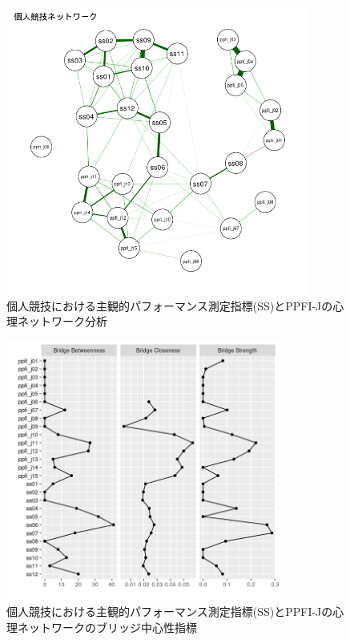 \documentclass[12pt,a4paper,xelatex,ja=standard]{bxjsarticle}
\begin{document}
\begin{figure}[H]
\centering
\includegraphics[clip,width = 10cm]{figure/individual network.png}
\caption{個人競技における主観的パフォーマンス測定指標(SS)とPPFI-Jの心理ネットワーク分析}
\end{figure}

\begin{figure}[H]
\centering
\includegraphics[clip,width = 9cm]{figure/individual_bridge.png}
\caption{個人競技における主観的パフォーマンス測定指標(SS)とPPFI-Jの心理ネットワークのブリッジ中心性指標}
\end{figure}
\end{document}
